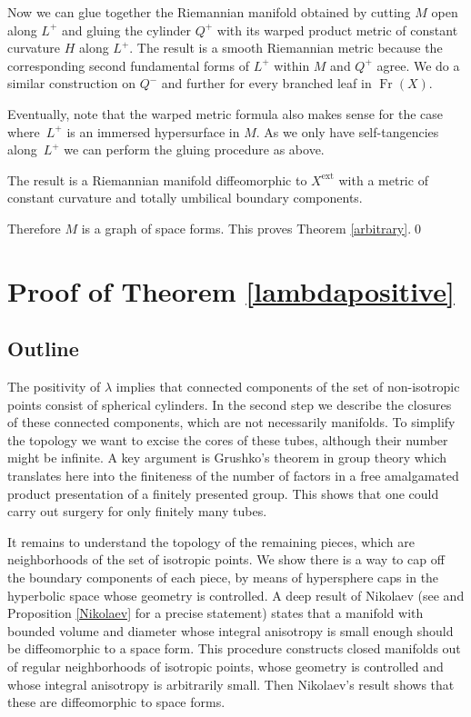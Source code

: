 \documentclass[10pt]{amsart}
\DeclareMathOperator{\Fr}{Fr}
\theoremstyle{definition}
\theoremstyle{remark}
\numberwithin{equation}{section}
\begin{document}
Now we can glue together the Riemannian manifold obtained by cutting $M$ open along $L^{+}$ and gluing
the cylinder $Q^{+}$ with its warped product metric of constant curvature $H$ along $L^{+}$.
The result is a smooth Riemannian metric because the corresponding second fundamental forms of $L^+$ within
$M$ and $Q^+$ agree. We do a similar construction on $Q^-$ and further for every branched leaf in $\Fr(X)$.

Eventually, note that the warped metric formula also makes sense for the case where~$L^{+}$ is an immersed hypersurface in $M$. As we only have self-tangencies along~$L^+$
we can perform the gluing procedure as above.

The result is a Riemannian manifold diffeomorphic to $X^\mathrm{ext}$ with a metric of
constant curvature and totally umbilical
boundary components.

Therefore $M$ is a graph of space forms.
This proves Theorem \ref{arbitrary}.\qed

\section{Proof of Theorem \ref{lambdapositive}}\label{sec:4}
\subsection{Outline}
The positivity of $\lambda$ implies that connected components of the set of
non-isotropic points consist of spherical cylinders.
In the second step we describe the closures of these connected components, which are not necessarily manifolds.
To simplify the topology we want to excise the cores of these tubes, although their number might be infinite.
A key argument is Grushko's theorem in group theory which translates here into the finiteness of the number
of factors in a free amalgamated product presentation of
a finitely presented group. This shows that one could carry out
surgery for only finitely many tubes.

It remains to understand the topology of the remaining pieces, which are
neighborhoods of the set of isotropic points.
We show there is a way to cap off the boundary components of each piece,
by means of hypersphere
caps in the hyperbolic space whose geometry is controlled.
A deep result of Nikolaev (see \cite{Nik} and Proposition \ref{Nikolaev} for a precise statement) states that
a manifold with bounded volume and diameter whose integral
anisotropy is small enough should be diffeomorphic to a space form.
This procedure constructs closed manifolds out of regular neighborhoods
of isotropic points, whose geometry is controlled and whose
integral anisotropy is arbitrarily small. Then Nikolaev's result
shows that these are diffeomorphic to space forms.
\end{document}
